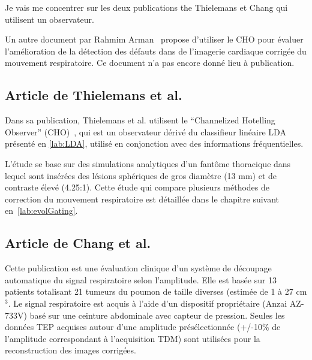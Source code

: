 Je vais me concentrer sur les deux publications the Thielemans et Chang qui utilisent un observateur.

Un autre document par Rahmim Arman~\cite{rahmim4d} propose d'utiliser le CHO pour évaluer l'amélioration de la détection des défauts dans de l'imagerie cardiaque corrigée du mouvement respiratoire. Ce document n'a pas encore donné lieu à publication.
	
\subsection{Article de Thielemans et al.~\cite{Thielemans2006Lesion}}
\label{lab:articleThielPres}
Dans sa publication, Thielemans et al. utilisent le ``Channelized Hotelling Observer'' (CHO)~\cite{barrett1993model}, qui est un observateur dérivé du classifieur linéaire LDA présenté en \ref{lab:LDA}, utilisé en conjonction avec des informations fréquentielles. 

L'étude se base sur des simulations analytiques d'un fantôme thoracique dans lequel sont insérées des lésions sphériques de gros diamètre (13 mm) et de contraste élevé (4.25:1). Cette étude qui compare plusieurs méthodes de correction du mouvement respiratoire est détaillée dans le chapitre suivant en~\ref{lab:evolGating}.
%






\subsection{Article de Chang et al.~\cite{GuopingChang2010Implementation}}

Cette publication est une évaluation clinique d'un système de découpage automatique du signal respiratoire selon l'amplitude. Elle est basée sur 13 patients totalisant 21 tumeurs du poumon de taille diverses (estimée de 1 à 27 cm$^3$. Le signal respiratoire est acquis à l'aide d'un dispositif propriétaire (Anzai AZ-733V) basé sur une ceinture abdominale avec capteur de pression. Seules les données TEP acquises autour d'une amplitude présélectionnée (+/-10\% de l'amplitude correspondant à l'acquisition TDM) sont utilisées pour la reconstruction des images corrigées. 

